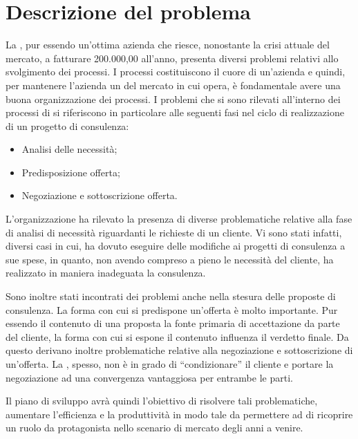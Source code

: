 
\section{Descrizione del problema}
La \customer , pur essendo un'ottima azienda che riesce, nonostante la crisi attuale del mercato, a fatturare  200.000,00 \text{\euro} all'anno, presenta diversi problemi relativi allo svolgimento dei processi.
I processi costituiscono il cuore di un'azienda e quindi, per mantenere l'azienda un  del mercato in cui opera, è fondamentale avere una buona organizzazione dei processi.
I problemi che si sono rilevati all'interno dei processi di \customer si riferiscono in particolare alle seguenti fasi nel ciclo di realizzazione di un progetto di consulenza:
\begin{itemize}
	\item Analisi delle necessità;
	\item Predisposizione offerta;
	\item Negoziazione e sottoscrizione offerta.
\end{itemize}

L'organizzazione ha rilevato la presenza di diverse problematiche relative alla fase di analisi di necessità riguardanti le richieste di un cliente. Vi sono stati infatti, diversi casi in cui, \customer  ha dovuto eseguire delle modifiche ai progetti di consulenza a sue spese, in quanto, non avendo compreso a pieno le necessità del cliente, ha  realizzato in maniera inadeguata la consulenza. 

Sono inoltre stati incontrati dei problemi anche nella stesura delle proposte di consulenza. La forma con cui si predispone un'offerta è molto importante. Pur essendo il contenuto di una proposta la fonte primaria di accettazione da parte del cliente, la forma con cui si espone il contenuto influenza il verdetto finale.
Da questo derivano inoltre problematiche relative alla negoziazione e sottoscrizione di un'offerta. La \customer , spesso, non è in grado di ``condizionare'' il cliente e portare la negoziazione ad una convergenza vantaggiosa per entrambe le parti.

Il piano di sviluppo avrà quindi l'obiettivo di risolvere tali problematiche, aumentare l'efficienza e la produttività in modo tale da permettere ad \customer di ricoprire un ruolo da protagonista nello scenario di mercato degli anni a venire.



